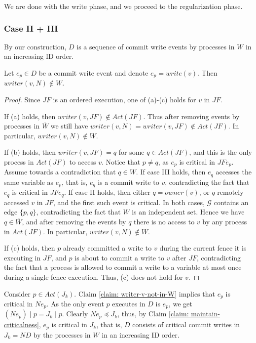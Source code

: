 We are done with the write phase, and we proceed to the regularization phase.

\subsubsection*{\hspace{5mm} Case II + III}
By our construction, $D$ is a sequence of commit write events by processes in $W$ in an increasing ID order.

\begin{claim-subsection} \label{claim: writer-v-not-in-W}
	Let $e_p \in D$ be a commit write event and denote $e_p = write(v)$. Then $writer(v,N) \notin W$.
\end{claim-subsection}

\begin{proof}
	Since $J F$ is an ordered execution, one of (a)-(c) holds for $v$ in $J F$.
	
	If (a) holds, then $writer(v,J F) \notin Act(J F)$. Thus after removing events by processes in $\overline{W}$ we still have $writer(v,N) = writer(v,J F) \notin Act(J F)$. In particular, $writer(v,N) \notin W$.
	
	If (b) holds, then $writer(v,J F) = q$ for some $q \in Act(J F)$, and this is the only process in $Act(J F)$ to access $v$. Notice that $p \neq q$, as $e_p$ is critical in $J F e_p$. Assume towards a contradiction that $q \in W$. If case III holds, then $e_q$ accesses the same variable as $e_p$, that is, $e_q$ is a commit write to $v$, contradicting the fact that $e_q$ is critical in $J F e_q$. If case II holds, then either $q = owner(v)$, or $q$ remotely accessed $v$ in $J F$, and the first such event is critical. In both cases, $\mathcal{G}$ contains an edge $\{p,q\}$, contradicting the fact that $W$ is an independent set. Hence we have $q \in \overline{W}$, and after removing the events by $q$ there is no access to $v$ by any process in $Act(J F)$. In particular, $writer(v,N) \notin W$.
	
	If (c) holds, then $p$ already committed a write to $v$ during the current fence it is executing in $J F$, and $p$ is about to commit a write to $v$ after $J F$, contradicting the fact that a process is allowed to commit a write to a variable at most once during a single fence execution. Thus, (c) does not hold for $v$.
\end{proof}

Consider $p \in Act(J_k)$. Claim \ref{claim: writer-v-not-in-W} implies that $e_p$ is critical in $N e_p$. As the only event $p$ executes in $D$ is $e_p$, we get $(N e_p) \mid p = J_k \mid p$. Clearly $N e_p \preceq J_k$, thus, by Claim \ref{claim: maintain-criticalness}, $e_p$ is critical in $J_k$, that is, $D$ consists of critical commit writes in $J_k = N D$ by the processes in $W$ in an increasing ID order.

